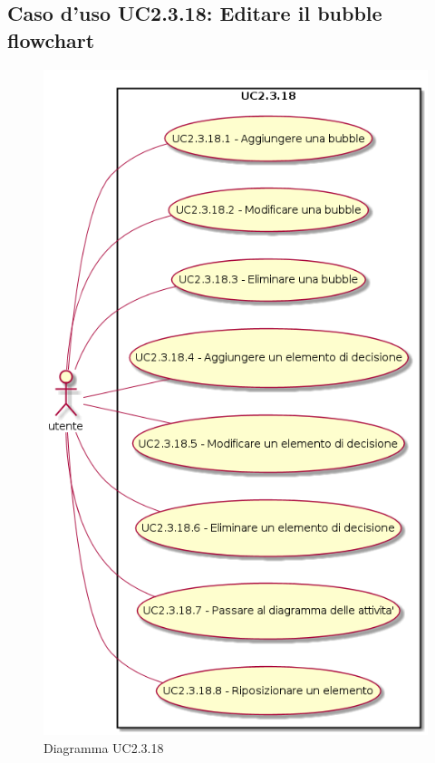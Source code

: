 \documentclass[../AnalisiDeiRequisiti.tex]{subfiles}
\begin{document}
					\subsection{Caso d'uso UC2.3.18: Editare il bubble flowchart}
					\begin{figure} [H]
						\centering
						\includegraphics[scale=0.45]{./Figures/UC2.3.18.png}
						\caption{Diagramma UC2.3.18}\label{}
					\end{figure}
\end{document}
